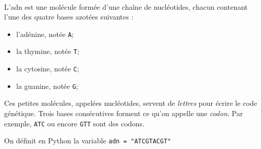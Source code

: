 \documentclass[11pt,a4paper]{article}
\begin{document}
\begin{Exercise}[title={Représentation et manipulation de l'{\sc adn}}, origin={\bac \; \sc capes nsi L3}]\\
	L'{\sc adn} est une molécule formée d'une chaîne de nucléotides, chacun contenant l'une des quatre bases azotées suivantes :
	\begin{itemize}
		\item l'adénine, notée {\tt A};
		\item la thymine, notée {\tt T};
		\item la cytosine, notée {\tt C};
		\item la guanine, notée {\tt G};
	\end{itemize}
	Ces petites molécules, appelées nucléotides, servent de \og{} \textit{lettres} \fg{} pour écrire le code génétique. Trois bases consécutives forment ce qu'on appelle une \textit{codon}. Par exemple, {\tt ATC} ou encore {\tt GTT} sont des codons.
	\medskip

	On définit en Python la variable \texttt{adn = "ATCGTACGT"}


\end{Exercise}
\end{document}
